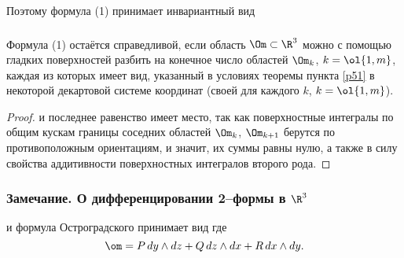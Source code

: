 \documentclass[a4paper]{article}
\begin{document}
Поэтому формула (1) принимает инвариантный вид

\subsubsection{}
\begin{theorem}
Формула (1) остаётся справедливой, если область $\Om\subset\R^3$
можно с помощью гладких поверхностей разбить на конечное число
областей $\Om_k$, $k=\ol{1,m}$, каждая из которых имеет вид,
указанный в условиях теоремы пункта \ref{p51} в некоторой декартовой
системе координат (своей для каждого $k$, $k=\ol{1,m}$).
\end{theorem}

\begin{proof}
 и последнее равенство имеет
место, так как поверхностные интегралы по общим кускам границы
соседних областей $\Om_k$, $\Om_{k+1}$ берутся по противоположным
ориентациям, и значит, их суммы равны нулю, а также в силу свойства
аддитивности поверхностных интегралов второго рода.
\end{proof}

\subsubsection{Замечание. О дифференцировании 2--формы в $\R^3$}
 и формула Остроградского принимает вид
 где $$\om=P\,dy\wedge
dz+Q\,dz\wedge dx + R\,dx\wedge dy.$$
\end{document}
